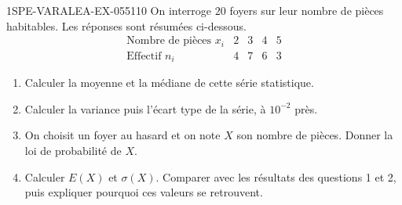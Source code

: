 \begin{exercice}{1SPE-VARALEA-EX-055}{1}{10}
On interroge $20$ foyers sur leur nombre de pièces habitables. Les réponses
sont résumées ci-dessous.
\[
\begin{array}{c|cccc}
  \text{Nombre de pièces } x_i & 2 & 3 & 4 & 5 \\
  \hline
  \text{Effectif } n_i & 4 & 7 & 6 & 3
\end{array}
\]
\begin{enumerate}
\item Calculer la moyenne et la médiane de cette série statistique.
\item Calculer la variance puis l'écart type de la série, à $10^{-2}$ près.
\item On choisit un foyer au hasard et on note $X$ son nombre de pièces.
  Donner la loi de probabilité de $X$.
\item Calculer $E(X)$ et $\sigma(X)$. Comparer avec les résultats des questions
  1 et 2, puis expliquer pourquoi ces valeurs se retrouvent.
\end{enumerate}
\end{exercice}
